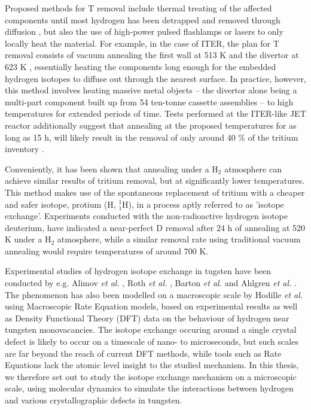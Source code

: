 Proposed methods for T removal include thermal treating of the affected components until most hydrogen has been detrapped and removed through diffusion \cite{heinola2017long}, but also the use of high-power pulsed flashlamps \cite{gibson2005removal} or lasers \cite{skinner2008recent,de2017efficiency} to only locally heat the material. 
For example, in the case of ITER, the plan for T removal consists of vacuum annealing the first wall at 513 K and the divertor at 623 K \cite{pitts2011physics}, essentially heating the components long enough for the embedded hydrogen isotopes to diffuse out through the nearest surface.
In practice, however, this method involves heating massive metal objects -- the divertor alone being a multi-part component built up from 54 ten-tonne cassette assemblies -- to high temperatures for extended periods of time. 
Tests performed at the ITER-like JET reactor additionally suggest that annealing at the proposed temperatures for as long as 15 h, will likely result in the removal of only around 40 \% of the tritium inventory \cite{heinola2017long}. 

Conveniently, it has been shown \cite{alimov2011hydrogen, roth2013hydrogen, barton2014deuterium} that annealing under a H$_2$ atmosphere can achieve similar results of tritium removal, but at significantly lower temperatures. 
This method makes use of the spontaneous replacement of tritium with a cheaper and safer isotope, protium (H, $^1_1$H), in a process aptly referred to as 'isotope exchange'. 
Experiments conducted with the non-radioactive hydrogen isotope deuterium, have indicated a near-perfect D removal after 24 h of annealing at 520 K under a H$_2$ atmosphere, while a similar removal rate using traditional vacuum annealing would require temperatures of around 700 K. \cite{ahlgren2019hydrogen}

Experimental studies of hydrogen isotope exchange in tugsten have been conducted by e.g. Alimov \textit{et al.} \cite{alimov2011hydrogen}, Roth \textit{et al.}  \cite{roth2013hydrogen}, Barton \textit{et al.} \cite{barton2014deuterium} and Ahlgren \textit{et al.} \cite{ahlgren2019hydrogen}. 
The phenomenon has also been modelled on a macroscopic scale by Hodille \textit{et al.} \cite{hodille2016study} using Macroscopic Rate Equation models, based on experimental results as well as Density Functional Theory (DFT) data on the behaviour of hydrogen near tungsten monovacancies. 
The isotope exchange occuring around a single crystal defect is likely to occur on a timescale of nano- to microseconds, but such scales are far beyond the reach of current DFT methods, while tools such as Rate Equations lack the atomic level insight to the studied mechanism.
In this thesis, we therefore set out to study the isotope exchange mechanism on a microscopic scale, using molecular dynamics to simulate the interactions between hydrogen and various crystallographic defects in tungsten.

